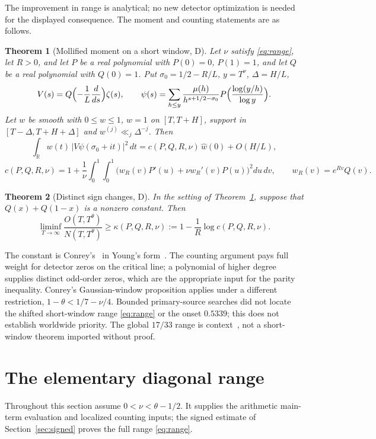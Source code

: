 \documentclass[11pt]{article}
\newtheorem{theorem}{Theorem}[section]
\theoremstyle{remark}
\newcommand{\R}{\mathbb R}
\newcommand{\wh}{\widehat w(0)}
\begin{document}
The improvement in range is analytical; no new detector optimization
is needed for the displayed consequence. The moment and counting
statements are as follows.

\begin{theorem}[Mollified moment on a short window, D]\label{thm:moment}
Let $\nu$ satisfy \eqref{eq:range}, let $R>0$, and let $P$ be a real polynomial with $P(0)=0$,
$P(1)=1$, and let $Q$ be a real polynomial with $Q(0)=1$. Put
$\sigma_0=1/2-R/L$, $y=T^\nu$, $\Delta=H/L$,
\[
 V(s)=Q\Bigl(-\frac1L\frac{d}{ds}\Bigr)\zeta(s),\qquad
 \psi(s)=\sum_{h\le y}\frac{\mu(h)}{h^{s+1/2-\sigma_0}}
 P\Bigl(\frac{\log(y/h)}{\log y}\Bigr).
\]
Let $w$ be smooth with $0\le w\le1$, $w=1$ on $[T,T+H]$, support in
$[T-\Delta,T+H+\Delta]$ and $w^{(j)}\ll_j\Delta^{-j}$. Then
\[
 \int_\R w(t)\,|V\psi(\sigma_0+it)|^2\,dt=c(P,Q,R,\nu)\,\wh+O(H/L),
\]
\[
 c(P,Q,R,\nu)=1+\frac1\nu\int_0^1\!\!\int_0^1
 \bigl(w_R(v)P'(u)+\nu w_R'(v)P(u)\bigr)^2du\,dv,\qquad w_R(v)=e^{Rv}Q(v).
\]
\end{theorem}

\begin{theorem}[Distinct sign changes, D]\label{thm:signs}
In the setting of Theorem~\ref{thm:moment}, suppose that $Q(x)+Q(1-x)$ is a
nonzero constant. Then
\[
 \liminf_{T\to\infty}\frac{O(T,T^\theta)}{N(T,T^\theta)}\ge
 \kappa(P,Q,R,\nu):=1-\frac1R\log c(P,Q,R,\nu).
\]
\end{theorem}

The constant is Conrey's~\cite{Conrey} in Young's form~\cite{Young}.
The counting argument pays full weight for detector zeros on the critical
line; a polynomial of higher degree supplies distinct odd-order zeros,
which are the appropriate input for the parity inequality. Conrey's
Gaussian-window proposition applies under a different restriction,
$1-\theta<1/7-\nu/4$. Bounded primary-source searches did not locate the
shifted short-window range \eqref{eq:range} or the onset $0.5339$; this
does not establish worldwide priority. The global $17/33$ range is
context~\cite{BC}, not a short-window theorem imported without proof.

\section{The elementary diagonal range}\label{sec:moment}

Throughout this section assume $0<\nu<\theta-1/2$. It supplies the
arithmetic main-term evaluation and localized counting inputs; the
signed estimate of Section~\ref{sec:signed} proves the full range
\eqref{eq:range}.
\end{document}
